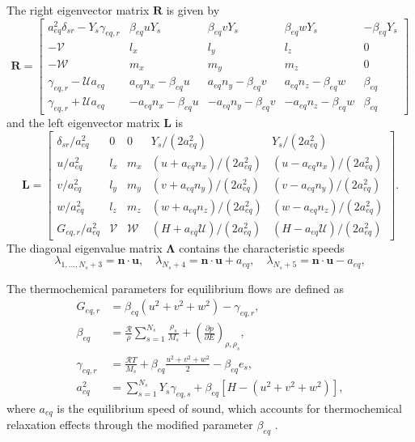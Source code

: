 The right eigenvector matrix $\mathbf{R}$ is given by
\begin{equation}
\mathbf{R} = \begin{bmatrix}
a_{eq}^2\delta_{sr} - Y_s\gamma_{eq,r} & \beta_{eq} u Y_s & \beta_{eq} v Y_s & \beta_{eq} w Y_s & -\beta_{eq} Y_s \\
-\mathcal{V} & l_x & l_y & l_z & 0 \\
-\mathcal{W} & m_x & m_y & m_z & 0 \\
\gamma_{eq,r} - \mathcal{U}a_{eq} & a_{eq} n_x - \beta_{eq} u & a_{eq} n_y - \beta_{eq} v & a_{eq} n_z - \beta_{eq} w & \beta_{eq} \\
\gamma_{eq,r} + \mathcal{U}a_{eq} & -a_{eq} n_x - \beta_{eq} u & -a_{eq} n_y - \beta_{eq} v & -a_{eq} n_z - \beta_{eq} w & \beta_{eq}
\end{bmatrix}
\end{equation}
and the left eigenvector matrix $\mathbf{L}$ is
\begin{equation}
\mathbf{L} = \begin{bmatrix}
\delta_{sr}/a_{eq}^2 & 0 & 0 & Y_s/(2a_{eq}^2) & Y_s/(2a_{eq}^2) \\
u/a_{eq}^2 & l_x & m_x & (u+a_{eq} n_x)/(2a_{eq}^2) & (u-a_{eq} n_x)/(2a_{eq}^2) \\
v/a_{eq}^2 & l_y & m_y & (v+a_{eq} n_y)/(2a_{eq}^2) & (v-a_{eq} n_y)/(2a_{eq}^2) \\
w/a_{eq}^2 & l_z & m_z & (w+a_{eq} n_z)/(2a_{eq}^2) & (w-a_{eq} n_z)/(2a_{eq}^2) \\
G_{eq,r}/a_{eq}^2 & \mathcal{V} & \mathcal{W} & (H+a_{eq}\mathcal{U})/(2a_{eq}^2) & (H-a_{eq}\mathcal{U})/(2a_{eq}^2)
\end{bmatrix}.
\end{equation}
The diagonal eigenvalue matrix $\mathbf{\Lambda}$ contains the characteristic speeds
\begin{equation}
\lambda_{1,\ldots,N_s+3} = \mathbf{n} \cdot \mathbf{u}, \quad \lambda_{N_s+4} = \mathbf{n} \cdot \mathbf{u} + a_{eq}, \quad \lambda_{N_s+5} = \mathbf{n} \cdot \mathbf{u} - a_{eq},
\end{equation}

The thermochemical parameters for equilibrium flows are defined as
\begin{align}
G_{eq,r} &= \beta_{eq}(u^2+v^2+w^2) - \gamma_{eq,r}, \\[0.8em]
\beta_{eq} &= \frac{\mathcal{R}}{\rho}\sum_{s=1}^{N_s}\frac{\rho_s}{M_s} + \left(\frac{\partial p}{\partial E}\right)_{\rho,\rho_s}, \\[0.8em]
\gamma_{eq,r} &= \frac{\mathcal{R}T}{M_s} + \beta_{eq}\frac{u^2+v^2+w^2}{2} - \beta_{eq} e_s, \\[0.8em]
a_{eq}^2 &= \sum_{s=1}^{N_s}Y_s\gamma_{eq,s} + \beta_{eq}\left[H - (u^2+v^2+w^2)\right],
\end{align}
where $a_{eq}$ is the equilibrium speed of sound, which accounts for thermochemical relaxation effects through the modified parameter $\beta_{eq}$ \citep{LiouEtAl1990}.



